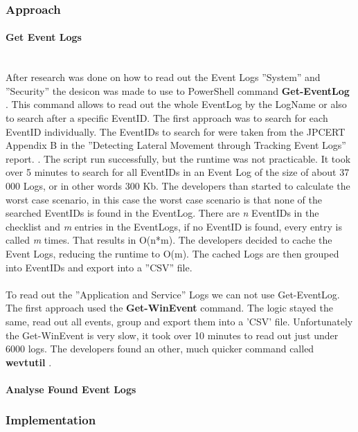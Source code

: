 \subsubsection{Approach}
\paragraph{Get Event Logs}\ \\
After research was done on how to read out the Event Logs ''System'' and ''Security'' the desicon was made to use to PowerShell command \textbf{Get-EventLog} \cite{Get-EventLogs}. This command allows to read out the whole EventLog by the LogName or also to search after a specific EventID. The first approach was to search for each EventID individually. The EventIDs to search for were taken from the JPCERT Appendix B in the ''Detecting Lateral Movement through Tracking Event Logs'' report. \cite{JPCERTDetectingLateralMovement}. The script run successfully, but the runtime was not practicable. It took over 5 minutes to search for all EventIDs in an Event Log of the size of about 37 000 Logs, or  in other words 300 Kb. The developers than started to calculate the worst case scenario, in this case the worst case scenario is that none of the searched EventIDs is found in the EventLog. There are \textit{n} EventIDs in the checklist and \textit{m} entries in the EventLogs, if no EventID is found, every entry is called \textit{m} times. That results in O(n*m). The developers decided to cache the Event Logs, reducing the runtime to O(m). The cached Logs are then grouped into EventIDs and export into a ''CSV'' file. \ \\
\ \\
To read out the ''Application and Service'' Logs we can not use Get-EventLog. The first approach used the \textbf{Get-WinEvent} \cite{Get-WinEvent} command. The logic stayed the same, read out all events, group and export them into a 'CSV' file. Unfortunately the Get-WinEvent is very slow, it took over 10 minutes to read out just under 6000 logs.
The developers found an other, much quicker command called \textbf{wevtutil} \cite{wevtutil}.
\paragraph{Analyse Found Event Logs}

\subsubsection{Implementation}